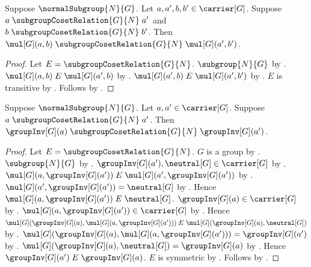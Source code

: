 \begin{theorem}\label{normal_coset_relation_mul_congruent}
    Suppose $\normalSubgroup{N}{G}$.
    Let $a,a',b,b'\in\carrier[G]$.
    Suppose
        $a\mathrel{\subgroupCosetRelation{G}{N}}a'$ and
        $b\mathrel{\subgroupCosetRelation{G}{N}}b'$.
    Then
        $\mul[G](a,b)
            \mathrel{\subgroupCosetRelation{G}{N}}
        \mul[G](a',b')$.
\end{theorem}
\begin{proof}
    Let $E=\subgroupCosetRelation{G}{N}$.
    $\subgroup{N}{G}$ by .
    $\mul[G](a,b)\mathrel{E}\mul[G](a',b)$ by
        .
    $\mul[G](a',b)\mathrel{E}\mul[G](a',b')$ by
        .
    $E$ is transitive by
        .
    Follows by .
\end{proof}

\begin{theorem}\label{normal_coset_relation_inverse_congruent}
    Suppose $\normalSubgroup{N}{G}$.
    Let $a,a'\in\carrier[G]$.
    Suppose
        $a\mathrel{\subgroupCosetRelation{G}{N}}a'$.
    Then
        $\groupInv[G](a)
            \mathrel{\subgroupCosetRelation{G}{N}}
        \groupInv[G](a')$.
\end{theorem}
\begin{proof}
    Let $E=\subgroupCosetRelation{G}{N}$.
    $G$ is a group by .
    $\subgroup{N}{G}$ by .
    $\groupInv[G](a'),\neutral[G]\in\carrier[G]$ by
        .
    $\mul[G](a,\groupInv[G](a'))
        \mathrel{E}
        \mul[G](a',\groupInv[G](a'))$ by
        .
    $\mul[G](a',\groupInv[G](a'))=\neutral[G]$ by
        .
    Hence
        $\mul[G](a,\groupInv[G](a'))\mathrel{E}\neutral[G]$.
    $\groupInv[G](a)\in\carrier[G]$ by .
    $\mul[G](a,\groupInv[G](a'))\in\carrier[G]$ by
        .
    Hence
        $\mul[G](\groupInv[G](a),
                 \mul[G](a,\groupInv[G](a')))
            \mathrel{E}
        \mul[G](\groupInv[G](a),\neutral[G])$ by
        .
    $\mul[G](\groupInv[G](a),
             \mul[G](a,\groupInv[G](a')))
        =\groupInv[G](a')$ by
        .
    $\mul[G](\groupInv[G](a),\neutral[G])=\groupInv[G](a)$ by
        .
    Hence $\groupInv[G](a')\mathrel{E}\groupInv[G](a)$.
    $E$ is symmetric by
        .
    Follows by .
\end{proof}

